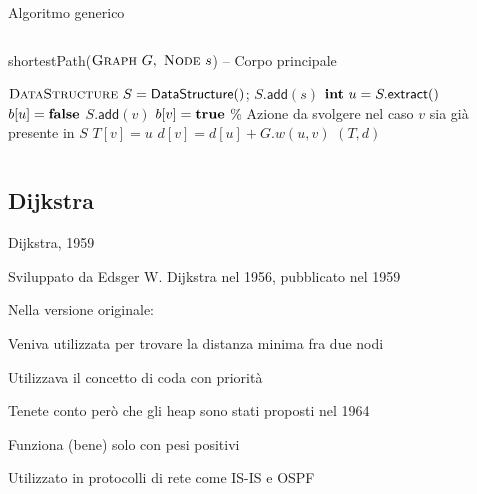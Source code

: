 \begin{frame}{Algoritmo generico}

\vspace{-24pt}
\begin{columns}
\small
\begin{Procedure}
\caption[A]{\textsf{shortestPath}($\textsc{Graph}\ G,\ \textsc{Node}\ s$) -- Corpo principale}
\alert{$\textsc{DataStructure}\ S = \textsf{DataStructure}()$; $S.\textsf{add}(s)$}\;
{
  \alert{$\INTEGER\ u = S.\textsf{extract}()$}\;
  $b[u] = \FALSE$\;
  {
    {
      {
        \alert{$S.\textsf{add}(v)$}\;
                $b[v] = \TRUE$\;
      }
      {
        \alert{\% Azione da svolgere nel caso $v$ sia già presente in $S$}
      }
      $T[v] = u$\;
      $d[v] = d[u] + G.w(u,v)$\;
    }
  }
}
\Return $(T,d)$
\end{Procedure}
\end{columns}

\end{frame}

\subsection{Dijkstra}


\begin{frame}{Dijkstra, 1959}

\vspace{-9pt}
\begin{myboxtitle}[Storia]
\BIL
\item Sviluppato da Edsger W. Dijkstra nel 1956, pubblicato nel 1959
\item Nella versione originale:
  \BI
  \item Veniva utilizzata per trovare la distanza minima fra due nodi
  \item Utilizzava il concetto di coda con priorità
  \item Tenete conto però che gli heap sono stati proposti nel 1964
  \EI
\EIL
\end{myboxtitle}

\begin{myboxtitle}[Note]
\BIL
\item Funziona (bene) solo con pesi positivi
\item Utilizzato in protocolli di rete come IS-IS e OSPF
\EIL
\end{myboxtitle}

\end{frame}


